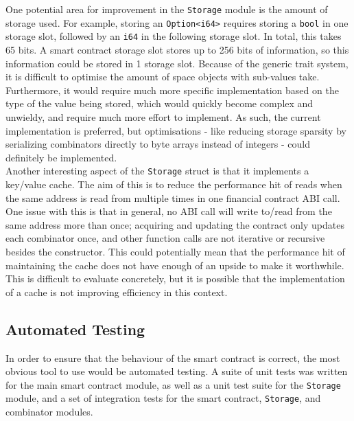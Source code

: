 One potential area for improvement in the \texttt{Storage} module is the amount of storage used. For example, storing an \texttt{Option<i64>} requires storing a \texttt{bool} in one storage slot, followed by an \texttt{i64} in the following storage slot. In total, this takes 65 bits. A smart contract storage slot stores up to 256 bits of information, so this information could be stored in 1 storage slot. Because of the generic trait system, it is difficult to optimise the amount of space objects with sub-values take. Furthermore, it would require much more specific implementation based on the type of the value being stored, which would quickly become complex and unwieldy, and require much more effort to implement. As such, the current implementation is preferred, but optimisations - like reducing storage sparsity by serializing combinators directly to byte arrays instead of integers - could definitely be implemented. \\

Another interesting aspect of the \texttt{Storage} struct is that it implements a key/value cache. The aim of this is to reduce the performance hit of reads when the same address is read from multiple times in one financial contract ABI call. One issue with this is that in general, no ABI call will write to/read from the same address more than once; acquiring and updating the contract only updates each combinator once, and other function calls are not iterative or recursive besides the constructor. This could potentially mean that the performance hit of maintaining the cache does not have enough of an upside to make it worthwhile. This is difficult to evaluate concretely, but it is possible that the implementation of a cache is not improving efficiency in this context.


\subsection{Automated Testing} \label{contract-testing}

In order to ensure that the behaviour of the smart contract is correct, the most obvious tool to use would be automated testing. A suite of unit tests was written for the main smart contract module, as well as a unit test suite for the \texttt{Storage} module, and a set of integration tests for the smart contract, \texttt{Storage}, and combinator modules. \\

